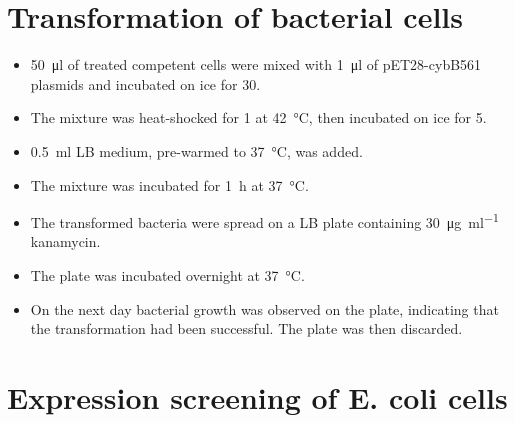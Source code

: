 \section{Transformation of bacterial cells}

\begin{itemize}
	\item \SI{50}{\ul} of  treated competent cells were mixed
		with \SI{1}{\ul} of pET28-cybB561 plasmids and incubated on ice
		for \SI{30}{\min}.
	\item The mixture was heat-shocked for \SI{1}{\min} at
		\SI{42}{\celsius}, then incubated on ice for \SI{5}{\min}.
	\item \SI{0.5}{\ml} LB medium, pre-warmed to \SI{37}{\celsius}, was
		added.
	\item The mixture was incubated for \SI{1}{\hour} at \SI{37}{\celsius}.
	\item The transformed bacteria were spread on a LB plate containing
		\SI{30}{\ug\per\ml} kanamycin.
	\item The plate was incubated overnight at \SI{37}{\celsius}.
	\item On the next day bacterial growth was observed on the plate,
		indicating that the transformation had been successful. The
		plate was then discarded.
\end{itemize}

\section{Expression screening of E. coli cells}

